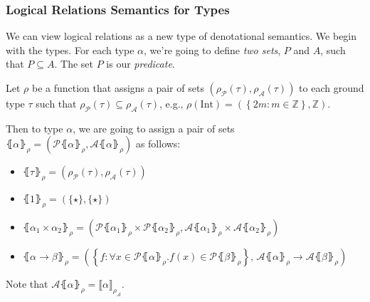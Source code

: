 \documentclass[aspectratio=169]{beamer}
\begin{document}
\begin{frame}
\frametitle{Logical Relations Semantics for Types}

We can view logical relations as a new type of denotational semantics.
We begin with the types.
For each type $\alpha$, we're going to define \emph{two sets}, $P$ and $A$, such that $P \subseteq A$.
The set $P$ is our \emph{predicate}.

\pause
\medskip

Let $\rho$ be a function that assigns a pair of sets $\left(\rho_{\mathcal{P}}(\tau), \rho_{\mathcal{A}}(\tau)\right)$ to each ground type $\tau$ such that $\rho_{\mathcal{P}}(\tau) \subseteq \rho_{\mathcal{A}}(\tau)$, e.g., $\rho(\text{Int}) = \left(\left\{2m : m \in \mathbb{Z}\right\}, \mathbb{Z}\right)$.

\pause
\medskip

Then to type $\alpha$, we are going to assign a pair of sets $\lBrace \alpha \rBrace_{\rho} = \left(\mathcal{P}\lBrace \alpha \rBrace_{\rho}, \mathcal{A}\lBrace \alpha \rBrace_{\rho}\right)$ as follows:

\begin{itemize}
    \pause
    \item $\lBrace \tau \rBrace_{\rho} = \left(\rho_{\mathcal{P}}(\tau), \rho_{\mathcal{A}}(\tau)\right)$
    \pause
    \item $\lBrace 1 \rBrace_{\rho} = \left(\{\star\}, \{\star\}\right)$
    \pause
    \item $\lBrace \alpha_1 \times \alpha_2 \rBrace_{\rho} = \left(\mathcal{P}\lBrace \alpha_1 \rBrace_{\rho} \times \mathcal{P}\lBrace \alpha_2 \rBrace_{\rho}, \mathcal{A}\lBrace \alpha_1 \rBrace_{\rho} \times \mathcal{A}\lBrace \alpha_2 \rBrace_{\rho}\right)$
    \pause
    \item $\lBrace \alpha \rightarrow \beta \rBrace_{\rho} = \left(\left\{ f : \forall x \in \mathcal{P}\lBrace \alpha \rBrace_{\rho}. f(x) \in \mathcal{P}\lBrace \beta \rBrace_{\rho} \right\},\, \mathcal{A}\lBrace \alpha \rBrace_{\rho} \rightarrow \mathcal{A}\lBrace \beta \rBrace_{\rho}\right)$
\end{itemize}

\pause

Note that $\mathcal{A}\lBrace \alpha \rBrace_{\rho} = \llbracket\alpha \rrbracket_{\rho_{\mathcal{A}}}$.

\end{frame}
\end{document}
